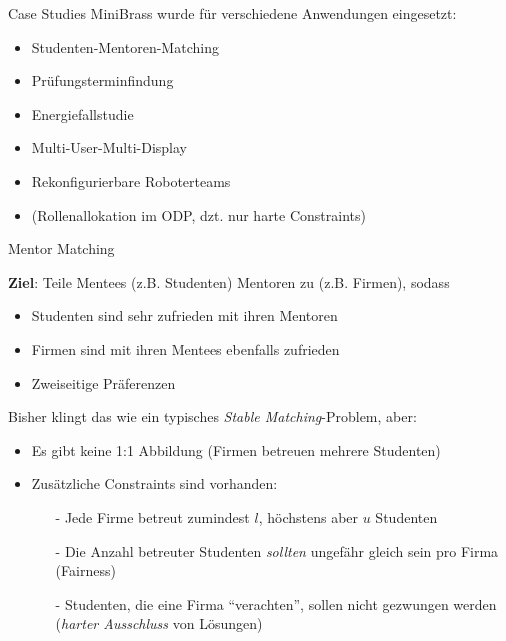 
\begin{frame}{Case Studies}
MiniBrass wurde für verschiedene Anwendungen eingesetzt:

\vspace*{2ex}

\begin{itemize}
\item \alert<2->{Studenten-Mentoren-Matching}
\item \alert<2->{Prüfungsterminfindung}
\item \alert<2->{Energiefallstudie}
\item Multi-User-Multi-Display
\item Rekonfigurierbare Roboterteams
\item (Rollenallokation im ODP, dzt. nur harte Constraints) 
\end{itemize}
\end{frame}



\begin{frame}[fragile]{Mentor Matching}

\textbf{Ziel}: Teile Mentees (z.B. Studenten) Mentoren zu (z.B. Firmen), sodass
\begin{itemize}
\item Studenten sind sehr zufrieden mit ihren Mentoren
\item Firmen sind mit ihren Mentees ebenfalls zufrieden
\item Zweiseitige Präferenzen
\end{itemize}

\vspace*{2ex}

Bisher klingt das wie ein typisches \emph{Stable Matching}-Problem, aber:

\begin{itemize}
\item Es gibt keine 1:1 Abbildung (Firmen betreuen mehrere Studenten)
\item Zusätzliche Constraints sind vorhanden:
\begin{itemize}
\item[-] Jede Firme betreut zumindest $l$, höchstens aber $u$ Studenten
\item[-] Die Anzahl betreuter Studenten \emph{sollten} ungefähr gleich sein pro Firma (Fairness)
\item[-] Studenten, die eine Firma ``verachten'', sollen nicht gezwungen werden (\emph{harter Ausschluss} von Lösungen)
\end{itemize}
\end{itemize}
\end{frame}


